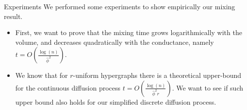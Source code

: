 \documentclass[../main.tex]{subfiles}
\begin{document}
	\begin{frame}{Experiments}
		We performed some experiments to show empirically our mixing result. 
		\begin{itemize}
			\item First, we want to prove that the mixing time grows logarithmically with the volume, and decreases quadratically with the conductance, namely $t=O\left(\frac{\log(n)}{\hat{\phi}^2}\right).$
			\item We know that for $r$-uniform hypergraphs there is a theoretical upper-bound for the continuous diffusion process $t=O\left(\frac{\log(n)}{\hat{\phi}^2 r}\right)$. We want to see if such upper bound also holds for our simplified discrete diffusion process.
		\end{itemize}
	\end{frame}
\end{document}
